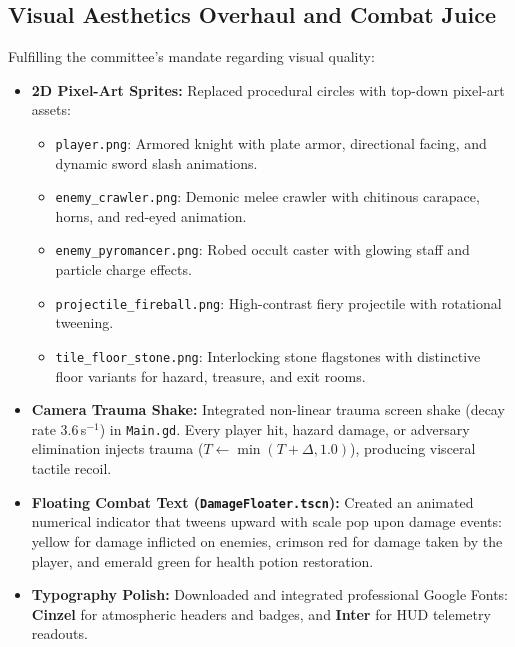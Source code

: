 \subsection{Visual Aesthetics Overhaul and Combat Juice}
Fulfilling the committee's mandate regarding visual quality:
\begin{itemize}
    \item \textbf{2D Pixel-Art Sprites:} Replaced procedural circles with top-down pixel-art assets:
    \begin{itemize}
        \item \texttt{player.png}: Armored knight with plate armor, directional facing, and dynamic sword slash animations.
        \item \texttt{enemy\_crawler.png}: Demonic melee crawler with chitinous carapace, horns, and red-eyed animation.
        \item \texttt{enemy\_pyromancer.png}: Robed occult caster with glowing staff and particle charge effects.
        \item \texttt{projectile\_fireball.png}: High-contrast fiery projectile with rotational tweening.
        \item \texttt{tile\_floor\_stone.png}: Interlocking stone flagstones with distinctive floor variants for hazard, treasure, and exit rooms.
    \end{itemize}
    \item \textbf{Camera Trauma Shake:} Integrated non-linear trauma screen shake (decay rate $3.6$\,s$^{-1}$) in \texttt{Main.gd}. Every player hit, hazard damage, or adversary elimination injects trauma ($T \leftarrow \min(T + \Delta, 1.0)$), producing visceral tactile recoil.
    \item \textbf{Floating Combat Text (\texttt{DamageFloater.tscn}):} Created an animated numerical indicator that tweens upward with scale pop upon damage events: yellow for damage inflicted on enemies, crimson red for damage taken by the player, and emerald green for health potion restoration.
    \item \textbf{Typography Polish:} Downloaded and integrated professional Google Fonts: \textbf{Cinzel} for atmospheric headers and badges, and \textbf{Inter} for HUD telemetry readouts.
\end{itemize}

